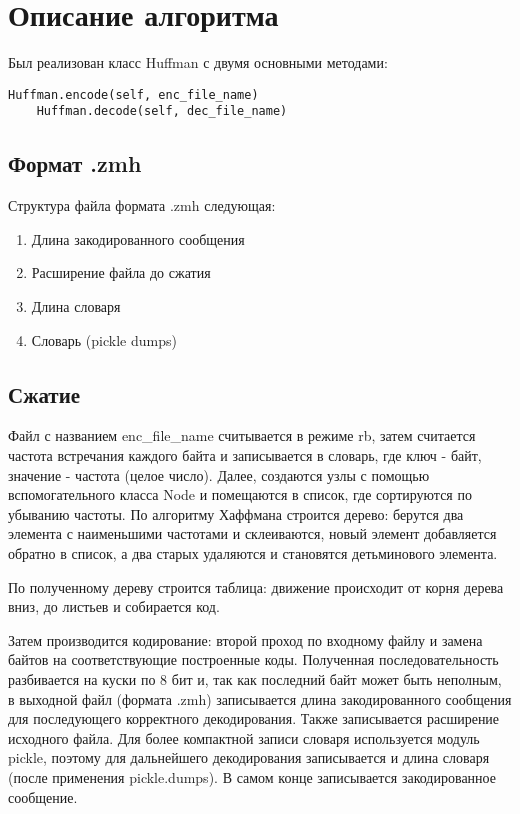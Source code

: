     

\section{Описание алгоритма}
Был реализован класс Huffman  с двумя основными методами: 
\begin{lstlisting}[numbers=none]
    Huffman.encode(self, enc_file_name)
    Huffman.decode(self, dec_file_name)
\end{lstlisting}
\subsection{Формат .zmh}
Структура файла формата .zmh следующая: 
\begin{enumerate}
    \item Длина закодированного сообщения
    \item Расширение файла до сжатия
    \item Длина словаря
    \item Словарь (pickle dumps)
\end{enumerate}

\subsection{Сжатие}
Файл с названием enc\_file\_name считывается в режиме rb, затем считается
частота встречания каждого байта и записывается в словарь, где ключ - байт, значение - частота (целое число).
Далее, создаются узлы с помощью вспомогательного класса Node и помещаются в список, где сортируются по убыванию частоты.
По алгоритму Хаффмана строится дерево: берутся два элемента с наименьшими частотами и \glqq склеиваются\grqq, новый элемент добавляется обратно в список, а два 
старых удаляются и становятся \glqq детьми\grqq\quad нового элемента. \par 
По полученному дереву строится таблица: движение происходит от корня дерева вниз, до листьев и собирается код. 
\par 
Затем производится кодирование: второй проход по входному файлу и замена байтов на соответствующие построенные коды. Полученная последовательность разбивается на куски по 8 бит и, 
так как последний байт может быть неполным, в выходной файл (формата .zmh) записывается длина закодированного сообщения для последующего корректного декодирования. Также записывается расширение исходного файла.
Для более компактной записи словаря используется модуль pickle, поэтому для дальнейшего декодирования записывается и длина словаря (после применения pickle.dumps). 
В самом конце записывается закодированное сообщение.
